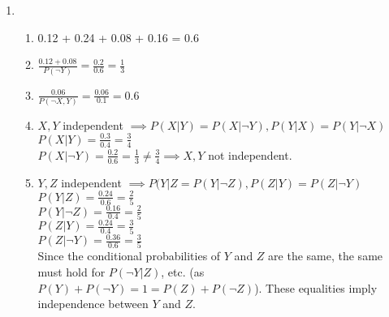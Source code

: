 \documentclass[12pt]{article}
\begin{document}
\fancyhfoffset[L]{0cm}
\fancyhfoffset[R]{0cm}
\rhead{\today}


\begin{enumerate}
    \setcounter{enumi}{0}
    \item
    \begin{enumerate}
        \item 0.12 + 0.24 + 0.08 + 0.16 = 0.6

        \item $\frac{0.12 + 0.08}{P(\neg Y)} = \frac{0.2}{0.6} = \frac{1}{3}$

        \item $\frac{0.06}{P(\neg X,Y)} = \frac{0.06}{0.1} = 0.6$ 

        \item $X,Y$ independent $\implies P(X|Y) = P(X | \neg Y), P(Y|X) = P(Y|\neg X)$\\
            $P(X|Y) = \frac{0.3}{0.4} = \frac{3}{4}$\\
            $P(X|\neg Y) = \frac{0.2}{0.6} = \frac{1}{3} \neq \frac{3}{4} \implies X,Y$ not independent.

        \item $Y,Z$ independent $\implies P(Y|Z = P(Y|\neg Z), P(Z|Y) = P(Z|\neg Y)$\\
            $P(Y|Z) = \frac{0.24}{0.6} = \frac{2}{5}$\\
            $P(Y|\neg Z) = \frac{0.16}{0.4} = \frac{2}{5}$\\
            $P(Z|Y) = \frac{0.24}{0.4} = \frac{3}{5}$\\
            $P(Z|\neg Y) = \frac{0.36}{0.6} = \frac{3}{5}$\\
            Since the conditional probabilities of $Y$ and $Z$ are the same, the same must hold for $P(\neg Y|Z)$, etc. (as $P(Y)+P(\neg Y) = 1 = P(Z)+P(\neg Z)$).  These equalities imply independence between $Y$ and $Z$.

    \end{enumerate}
\end{enumerate}
\end{document}
